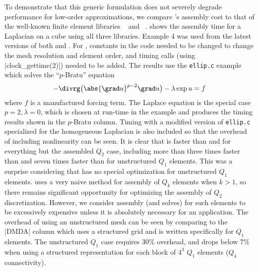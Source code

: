 To demonstrate that this generic formulation does not severely degrade performance for low-order approximations, we compare \Dohp's assembly cost to that of the well-known finite element libraries {\libmesh}~\citep{libmesh} and {\dealii}~\citep{bangerth2007deal}.
 shows the assembly time for a Laplacian on a cube using all three libraries.
Example 4 was used from the latest versions of both {\libmesh} and {\dealii}.
For \dealii, constants in the code needed to be changed to change the mesh resolution and element order, and timing calls (using \cverb|clock_gettime(2)|) needed to be added.
The {\Dohp} results use the \verb|ellip.c| example which solves the ``$p$-Bratu'' equation
\begin{align*}
  -\divrg \big(\abs{\grad u}^{p-2} \grad u \big) - \lambda \exp u = f
\end{align*}
where $f$ is a manufactured forcing term.
The Laplace equation is the special case $p=2, \lambda=0$, which is chosen at run-time in the example and produces the timing results shown in the $p$-Bratu column.
Timing with a modified version of \verb|ellip.c| specialized for the homogeneous Laplacian is also included so that the overhead of including nonlinearity can be seen.
It is clear that {\Dohp} is faster than {\libmesh} and {\dealii} for everything but the assembled $Q_2$ case, including more than three times faster than {\dealii} and seven times faster than {\libmesh} for unstructured $Q_1$ elements.
This was a surprise considering that {\Dohp} has no special optimization for unstructured $Q_1$ elements.
{\Dohp} uses a very naive method for assembly of $Q_k$ elements when $k>1$, so there remains significant opportunity for optimizing the assembly of $Q_2$ discretization.
However, we consider assembly (and solves) for such elements to be excessively expensive unless it is absolutely necessary for an application.
The overhead of using an unstructured mesh can be seen by comparing to the \cverb|DMDA| column which uses a structured grid and is written specifically for $Q_1$ elements.
The unstructured $Q_1$ case requires 30\% overhead, and drops below 7\% when using a structured representation for each block of $4^3$ $Q_1$ elements ($Q_4$ connectivity).


